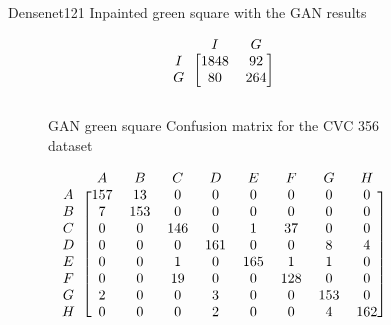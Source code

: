 \begin{figure}
\caption{Densenet121 Inpainted green square with the GAN results}
\myfontsize
\caption*{\footnotesize \textmd{ \textbf{A}:{dyed-lifted-polyps} , \textbf{B}:{dyed-resection-margins} , \textbf{C}:{esophagitis} , \textbf{D}:{normal-cecum} , \textbf{E}:{normal-pylorus} , \textbf{F}:{normal-z-line} , \textbf{G}:{polyps} , \textbf{H}:{ulcerative-colitis} , \textbf{I}:{non-polyp}}}

\begin{subfigure}[b]{0.25\textwidth}
     
\[
\begin{blockarray}{ccc}
& I & G  \\
\begin{block}{c[cc]}
        I&1848 &  92\\
        G& 80 &  264\\
\end{block}
\end{blockarray}
 \]         

\caption{GAN green square Confusion matrix for the CVC 356 dataset}
\label{mat:cvc356_CM_DN121_GAN_SQUARE}
\end{subfigure}
\begin{subfigure}[b]{0.49\textwidth}  
\scriptsize     
\[
\begin{blockarray}{ccccccccc}
& A & B & C & D & E & F & G & H \\
\begin{block}{c[cccccccc]}
A&157 & 13 & 0 & 0 & 0 & 0 & 0 & 0\\
B&  7 & 153 & 0 & 0 & 0 & 0 & 0 & 0\\
C&  0 & 0 & 146 & 0 & 1 & 37 & 0 & 0\\
D&  0 & 0 & 0 & 161 & 0 & 0 & 8 & 4\\
E&  0 & 0 & 1 & 0 & 165 & 1 & 1 & 0\\
F&  0 & 0 & 19 & 0 & 0 & 128 & 0 & 0\\
G&  2 & 0 & 0 & 3 & 0 & 0 & 153 & 0\\
H&  0 & 0 & 0 & 2 & 0 & 0 & 4 & 162\\
\end{block}
\end{blockarray}
 \]        
        

\end{subfigure}
\end{figure}
